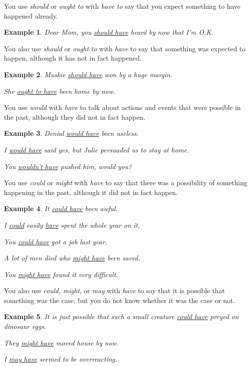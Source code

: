 \documentclass[oneside]{book}
\numberwithin{equation}{section}
\newtheorem{example}{Example}[section]
\begin{document}
%
\noindent{} You use \textit{should} or \textit{ought to} with \textit{have to} say that you expect something to have happened already.
\begin{example}
    Dear Mom, you \underline{should have} heard by now that I'm O.K.
\end{example}
You also use \textit{should} or \textit{ought to} with \textit{have} to say that something was expected to happen, although it has not in fact happened.
\begin{example}
    Muskie \underline{should have} won by a huge margin.
    
    She \underline{ought to have} been home by now.
\end{example}
%
\noindent{} You use \textit{would} with \textit{have} to talk about actions and events that were possible in the past, although they did not in fact happen.
\begin{example}
    Denial \underline{would have} been useless.
    
    I \underline{would have} said yes, but Julie persuaded us to stay at home.
    
    You \underline{wouldn't have} pushed him, would you?
\end{example}
%
\noindent{} You use \textit{could} or \textit{might} with \textit{have} to say that there was a possibility of something happening in the past, although it did not in fact happen.
\begin{example}
    It \underline{could have} been awful.
    
    I \underline{could} easily \underline{have} spent the whole year on it.
    
    You \underline{could have} got a job last year.
    
    A lot of men died who \underline{might have} been saved.
    
    You \underline{might have} found it very difficult.
\end{example}
%
\noindent{} You also use \textit{could, might}, or \textit{may} with \textit{have} to say that it is possible that something was the case, but you do not know whether it was the case or not.
\begin{example}
    It is just possible that such a small creature \underline{could have} preyed on dinosaur eggs.
    
    They \underline{might have} moved house by now.
    
    I \underline{may have} seemed to be overreacting.
\end{example}
\end{document}
